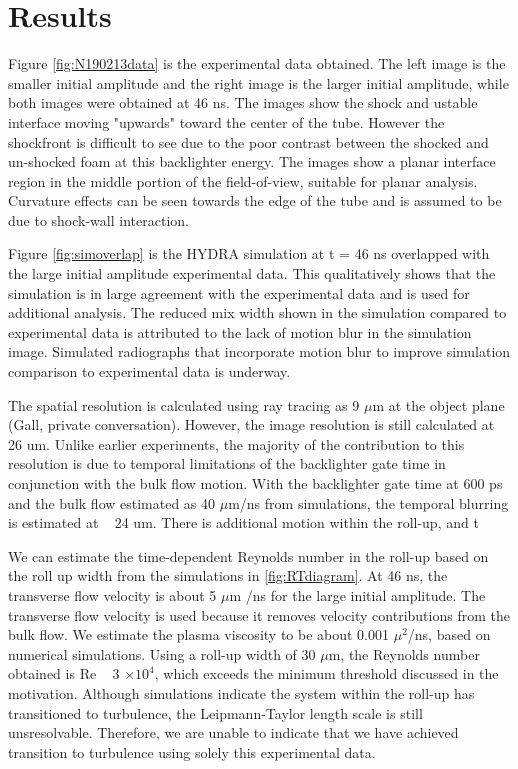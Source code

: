 \section{Results}



Figure \ref{fig:N190213data} is the experimental data obtained.  The left image is the smaller initial amplitude and the right image is the larger initial amplitude, while both images were obtained at 46 ns. The images show the shock and ustable interface moving "upwards" toward the center of the tube.  However the shockfront is difficult to see due to the poor contrast between the shocked and un-shocked foam at this backlighter energy.  The images show a planar interface region in the middle portion of the field-of-view, suitable for planar analysis.  Curvature effects can be seen towards the edge of the tube and is assumed to be due to shock-wall interaction.

Figure \ref{fig:simoverlap} is the HYDRA simulation at t = 46 ns overlapped with the large initial amplitude experimental data.  This qualitatively shows that the simulation is in large agreement with the experimental data and is used for additional analysis. The reduced mix width shown in the simulation compared to experimental data is attributed to the lack of motion blur in the simulation image.  Simulated radiographs that incorporate motion blur to improve simulation comparison to experimental data is underway.


The spatial resolution is calculated using ray tracing as 9 $\mu$m at the object plane (Gall, private conversation). However, the image resolution is still calculated at 26 um.  Unlike earlier experiments, the majority of the contribution to this resolution is due to temporal limitations of the backlighter gate time in conjunction with the bulk flow motion.  With the backlighter gate time at 600 ps and the bulk flow estimated as 40 $\mu$m/ns from simulations, the temporal blurring is estimated at ~ 24 um.  There is additional motion within the roll-up, and t



We can estimate the time-dependent Reynolds number in the roll-up based on the roll up width from the simulations in \ref{fig:RTdiagram}. At 46 ns, the transverse flow velocity is about 5 $\mu$m /ns for the large initial amplitude. The transverse flow velocity is used because it removes velocity contributions from the bulk flow. We estimate the plasma viscosity to be about 0.001 $\mu^2$/ns, based on numerical simulations. Using a roll-up width of 30 $\mu$m, the Reynolds number obtained is Re ~ 3 $\times 10^4$, which exceeds the minimum threshold discussed in the motivation.  Although simulations indicate the system within the roll-up has transitioned to turbulence, the Leipmann-Taylor length scale is still unsresolvable. Therefore, we are unable to  indicate that we have achieved  transition to turbulence using solely this experimental data. 




